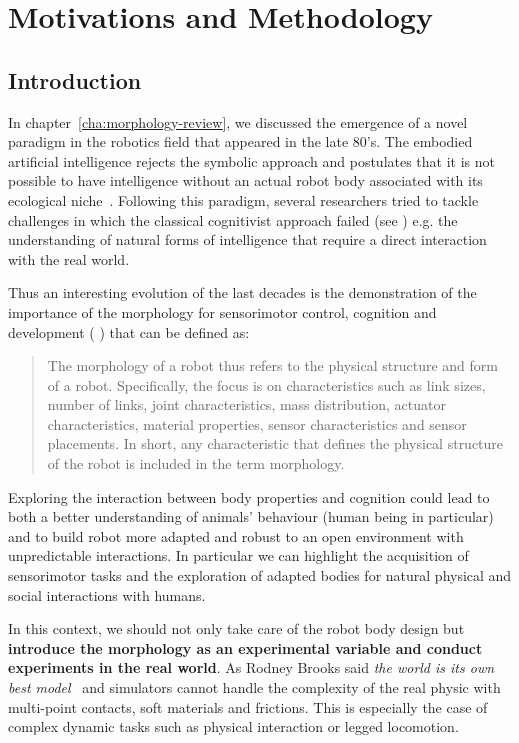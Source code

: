
\chapter{Motivations and Methodology}
\label{cha:methodology}

\section{Introduction} %

In chapter~\ref{cha:morphology-review}, we discussed the emergence of a novel paradigm in the robotics field that appeared in the late 80's. The embodied artificial intelligence rejects the symbolic approach and postulates that it is not possible to have intelligence without an actual robot body associated with its ecological niche~\cite{pfeifer2001understanding}. Following this paradigm, several researchers tried to tackle challenges in which the classical cognitivist approach failed (see \cite{brooks1986achieving}) e.g. the understanding of natural forms of intelligence that require a direct interaction with the real world.

Thus an interesting evolution of the last decades is the demonstration of the importance of the morphology for sensorimotor control, cognition and development (\cite{kaplan2008corps} \cite{steels1995artificial} \cite{Pfeifer06}) that can be defined as:
\begin{quotation}
    The morphology of a robot thus refers to the physical structure and form of a robot. Specifically, the focus is on characteristics such as link sizes, number of links, joint characteristics, mass distribution, actuator characteristics, material properties, sensor characteristics and sensor placements. In short, any characteristic that defines the physical structure of the robot is included in the term morphology.
\end{quotation}

Exploring the interaction between body properties and cognition could lead to both a better understanding of animals’ behaviour (human being in particular) and to build robot more adapted and robust to an open environment with unpredictable interactions. In particular we can highlight the acquisition of sensorimotor tasks and the exploration of adapted bodies for natural physical and social interactions with humans.

In this context, we should not only take care of the robot body design but \textbf{introduce the morphology as an experimental variable and conduct experiments in the real world}. As Rodney Brooks said \emph{the world is its own best model}~\cite{brooks1991intelligence} and simulators cannot handle the complexity of the real physic with multi-point contacts, soft materials and frictions. This is especially the case of complex dynamic tasks such as physical interaction or legged locomotion.

